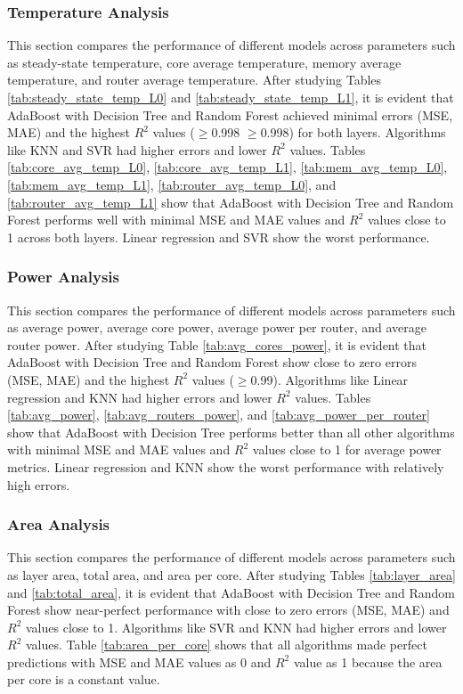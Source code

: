 \documentclass[conference]{IEEEtran}
\begin{document}
	\subsubsection{Temperature Analysis}
	This section compares the performance of different models across parameters such as steady-state temperature, core average temperature, memory average temperature, and router average temperature. After studying Tables \ref{tab:steady_state_temp_L0} and \ref{tab:steady_state_temp_L1}, it is evident that AdaBoost with Decision Tree and Random Forest achieved minimal errors (MSE, MAE) and the highest $R^2$ values ($\geq$0.998 $\geq$0.998) for both layers. Algorithms like KNN and SVR had higher errors and lower $R^2$ values. Tables \ref{tab:core_avg_temp_L0}, \ref{tab:core_avg_temp_L1}, \ref{tab:mem_avg_temp_L0}, \ref{tab:mem_avg_temp_L1}, \ref{tab:router_avg_temp_L0}, and \ref{tab:router_avg_temp_L1} show that AdaBoost with Decision Tree and Random Forest performs well with minimal MSE and MAE values and $R^2$ values close to 1 across both layers. Linear regression and SVR show the worst performance.
	
	\subsubsection{Power Analysis}
	This section compares the performance of different models across parameters such as average power, average core power, average power per router, and average router power. After studying Table \ref{tab:avg_cores_power}, it is evident that AdaBoost with Decision Tree and Random Forest show close to zero errors (MSE, MAE) and the highest $R^2$ values ($\geq$0.99). Algorithms like Linear regression and KNN had higher errors and lower $R^2$ values. Tables \ref{tab:avg_power}, \ref{tab:avg_routers_power}, and \ref{tab:avg_power_per_router} show that AdaBoost with Decision Tree performs better than all other algorithms with minimal MSE and MAE values and $R^2$ values close to 1 for average power metrics. Linear regression and KNN show the worst performance with relatively high errors.
	
	\subsubsection{Area Analysis}
	This section compares the performance of different models across parameters such as layer area, total area, and area per core. After studying Tables \ref{tab:layer_area} and \ref{tab:total_area}, it is evident that AdaBoost with Decision Tree and Random Forest show near-perfect performance with close to zero errors (MSE, MAE) and $R^2$ values close to 1. Algorithms like SVR and KNN had higher errors and lower $R^2$ values. Table \ref{tab:area_per_core} shows that all algorithms made perfect predictions with MSE and MAE values as 0 and $R^2$ value as 1 because the area per core is a constant value.
	
\end{document}
